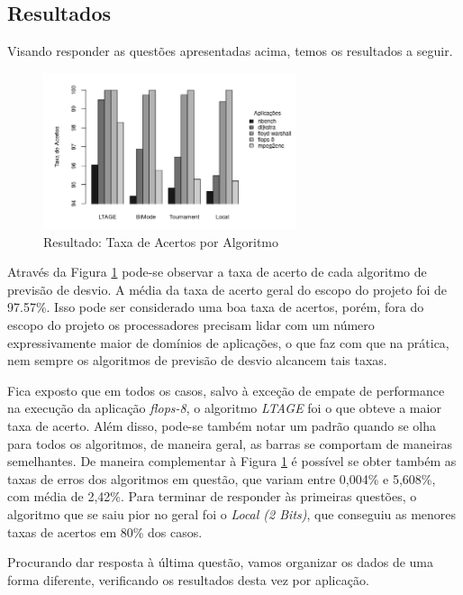 \documentclass[12pt]{article}
\begin{document}
\subsection{Resultados}

Visando responder as questões apresentadas acima, temos os resultados a seguir.

\begin{figure}[H]
\centering
\includegraphics[width=0.66\textwidth]{algTax.jpeg}
\caption{Resultado: Taxa de Acertos por Algoritmo}
\label{fig:algTax}
\end{figure}

Através da Figura \ref{fig:algTax} pode-se observar a taxa de acerto de cada algoritmo de previsão de desvio. A média
da taxa de acerto geral do escopo do projeto foi de 97.57\%. Isso pode ser considerado uma boa taxa de acertos, porém, fora
do escopo do projeto os processadores precisam lidar com um número expressivamente maior de domínios de aplicações, o que faz
com que na prática, nem sempre os algoritmos de previsão de desvio alcancem tais taxas.

Fica exposto que em todos os casos, salvo à exceção de empate de performance na execução da aplicação \textit{flops-8},
o algoritmo \textit{LTAGE} foi o que obteve a maior taxa de acerto. Além disso, pode-se também notar um padrão quando se olha
para todos os algoritmos, de maneira geral, as barras se comportam de maneiras semelhantes. De maneira complementar à Figura \ref{fig:algTax}
é possível se obter também as taxas de erros dos algoritmos em questão, que variam entre 0,004\% e 5,608\%, com média de 2,42\%. %
Para terminar de responder às primeiras questões, o algoritmo que se saiu pior no geral foi o \textit{Local (2 Bits)}, que 
conseguiu as menores taxas de acertos em 80\% dos casos.

Procurando dar resposta à última questão, vamos organizar os dados de uma forma diferente, verificando os resultados desta vez
por aplicação.
\end{document}
